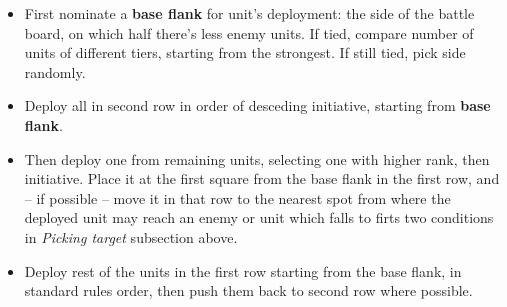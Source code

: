 \begin{multicols*}{2}
    \begin{itemize}
        \item First nominate a \textbf{base flank} for unit's deployment: the side of the battle board, on which half there's less enemy units. If tied, compare number of units of different tiers, starting from the strongest. If still tied, pick side randomly.
        \item Deploy all  in second row in order of desceding initiative, starting from \textbf{base flank}.
        \item Then deploy one from remaining units, selecting one with higher rank, then initiative. Place it at the first square from the base flank in the first row, and -- if possible -- move it in that row to the nearest spot from where the deployed unit may reach an enemy  or unit which falls to firts two conditions in \textit{Picking target} subsection above.
        \item Deploy rest of the units in the first row starting from the base flank, in standard rules order, then push them back to second row where possible.
    \end{itemize}
\end{multicols*}
